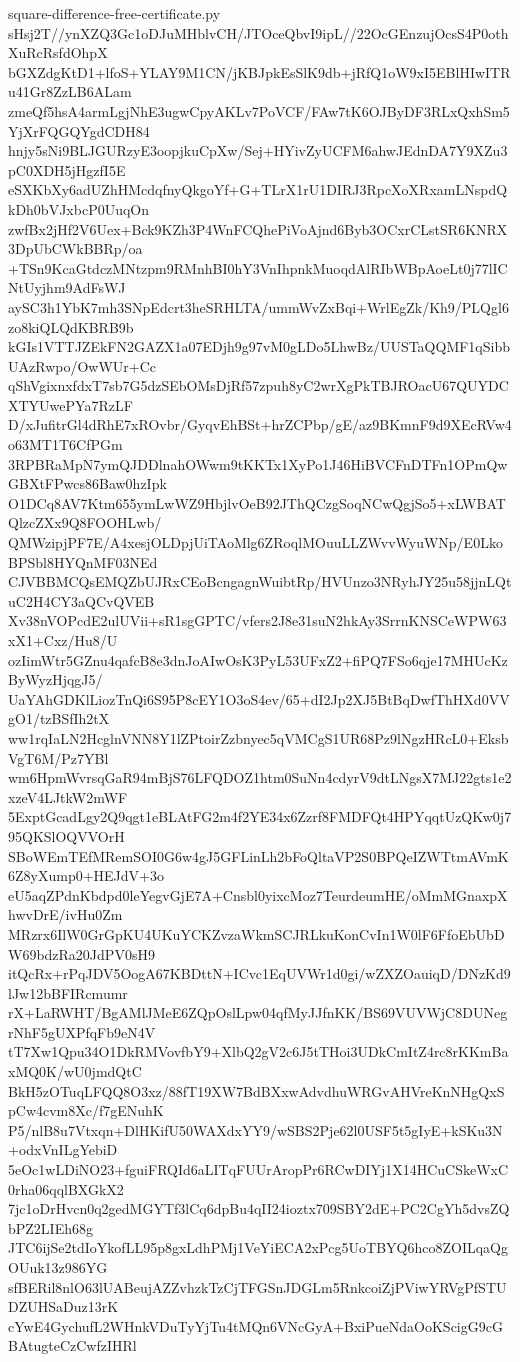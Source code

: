 \documentclass[11pt]{article}
\theoremstyle{definition}
\theoremstyle{remark}
\begin{document}
\begin{filecontents*}[overwrite]{square-difference-free-certificate.py}
sHsj2T//ynXZQ3Gc1oDJuMHblvCH/JTOceQbvI9ipL//22OcGEnzujOcsS4P0othXuRcRsfdOhpX
bGXZdgKtD1+lfoS+YLAY9M1CN/jKBJpkEsSlK9db+jRfQ1oW9xI5EBlHIwITRu41Gr8ZzLB6ALam
zmeQf5hsA4armLgjNhE3ugwCpyAKLv7PoVCF/FAw7tK6OJByDF3RLxQxhSm5YjXrFQGQYgdCDH84
hnjy5sNi9BLJGURzyE3oopjkuCpXw/Sej+HYivZyUCFM6ahwJEdnDA7Y9XZu3pC0XDH5jHgzfI5E
eSXKbXy6adUZhHMcdqfnyQkgoYf+G+TLrX1rU1DIRJ3RpcXoXRxamLNspdQkDh0bVJxbcP0UuqOn
zwfBx2jHf2V6Uex+Bck9KZh3P4WnFCQhePiVoAjnd6Byb3OCxrCLstSR6KNRX3DpUbCWkBBRp/oa
+TSn9KcaGtdczMNtzpm9RMnhBI0hY3VnIhpnkMuoqdAlRIbWBpAoeLt0j77lICNtUyjhm9AdFsWJ
aySC3h1YbK7mh3SNpEdcrt3heSRHLTA/ummWvZxBqi+WrlEgZk/Kh9/PLQgl6zo8kiQLQdKBRB9b
kGIs1VTTJZEkFN2GAZX1a07EDjh9g97vM0gLDo5LhwBz/UUSTaQQMF1qSibbUAzRwpo/OwWUr+Cc
qShVgixnxfdxT7sb7G5dzSEbOMsDjRf57zpuh8yC2wrXgPkTBJROacU67QUYDCXTYUwePYa7RzLF
D/xJufitrGl4dRhE7xROvbr/GyqvEhBSt+hrZCPbp/gE/az9BKmnF9d9XEcRVw4o63MT1T6CfPGm
3RPBRaMpN7ymQJDDlnahOWwm9tKKTx1XyPo1J46HiBVCFnDTFn1OPmQwGBXtFPwcs86Baw0hzIpk
O1DCq8AV7Ktm655ymLwWZ9HbjlvOeB92JThQCzgSoqNCwQgjSo5+xLWBATQlzcZXx9Q8FOOHLwb/
QMWzipjPF7E/A4xesjOLDpjUiTAoMlg6ZRoqlMOuuLLZWvvWyuWNp/E0LkoBPSbl8HYQnMF03NEd
CJVBBMCQsEMQZbUJRxCEoBcngagnWuibtRp/HVUnzo3NRyhJY25u58jjnLQtuC2H4CY3aQCvQVEB
Xv38nVOPcdE2ulUVii+sR1sgGPTC/vfers2J8e31suN2hkAy3SrrnKNSCeWPW63xX1+Cxz/Hu8/U
ozIimWtr5GZnu4qafcB8e3dnJoAIwOsK3PyL53UFxZ2+fiPQ7FSo6qje17MHUcKzByWyzHjqgJ5/
UaYAhGDKlLiozTnQi6S95P8cEY1O3oS4ev/65+dI2Jp2XJ5BtBqDwfThHXd0VVgO1/tzBSfIh2tX
ww1rqIaLN2HcglnVNN8Y1lZPtoirZzbnyec5qVMCgS1UR68Pz9lNgzHRcL0+EksbVgT6M/Pz7YBl
wm6HpmWvrsqGaR94mBjS76LFQDOZ1htm0SuNn4cdyrV9dtLNgsX7MJ22gts1e2xzeV4LJtkW2mWF
5ExptGcadLgy2Q9qgt1eBLAtFG2m4f2YE34x6Zzrf8FMDFQt4HPYqqtUzQKw0j795QKSlOQVVOrH
SBoWEmTEfMRemSOI0G6w4gJ5GFLinLh2bFoQltaVP2S0BPQeIZWTtmAVmK6Z8yXump0+HEJdV+3o
eU5aqZPdnKbdpd0leYegvGjE7A+Cnsbl0yixcMoz7TeurdeumHE/oMmMGnaxpXhwvDrE/ivHu0Zm
MRzrx6IlW0GrGpKU4UKuYCKZvzaWkmSCJRLkuKonCvIn1W0lF6FfoEbUbDW69bdzRa20JdPV0sH9
itQcRx+rPqJDV5OogA67KBDttN+ICvc1EqUVWr1d0gi/wZXZOauiqD/DNzKd9lJw12bBFIRcmumr
rX+LaRWHT/BgAMlJMeE6ZQpOslLpw04qfMyJJfnKK/BS69VUVWjC8DUNegrNhF5gUXPfqFb9eN4V
tT7Xw1Qpu34O1DkRMVovfbY9+XlbQ2gV2c6J5tTHoi3UDkCmItZ4rc8rKKmBaxMQ0K/wU0jmdQtC
BkH5zOTuqLFQQ8O3xz/88fT19XW7BdBXxwAdvdhuWRGvAHVreKnNHgQxSpCw4cvm8Xc/f7gENuhK
P5/nlB8u7Vtxqn+DlHKifU50WAXdxYY9/wSBS2Pje62l0USF5t5gIyE+kSKu3N+odxVnILgYebiD
5eOc1wLDiNO23+fguiFRQId6aLITqFUUrAropPr6RCwDIYj1X14HCuCSkeWxC0rha06qqlBXGkX2
7jc1oDrHvcn0q2gedMGYTf3lCq6dpBu4qII24ioztx709SBY2dE+PC2CgYh5dvsZQbPZ2LIEh68g
JTC6ijSe2tdIoYkofLL95p8gxLdhPMj1VeYiECA2xPcg5UoTBYQ6hco8ZOILqaQgOUuk13z986YG
sfBERil8nlO63lUABeujAZZvhzkTzCjTFGSnJDGLm5RnkcoiZjPViwYRVgPfSTUDZUHSaDuz13rK
cYwE4GychufL2WHnkVDuTyYjTu4tMQn6VNcGyA+BxiPueNdaOoKScigG9cGBAtugteCzCwfzIHRl

\end{filecontents*}
\end{document}
